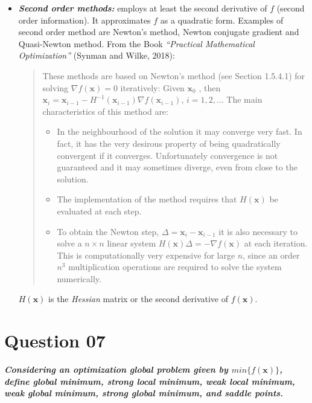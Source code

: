 \documentclass[conference]{IEEEtran}
\begin{document}
\begin{itemize}
	\item \textbf{\textit{Second order methods:}} employs at least the second derivative of $f$ (second order information). It approximates $f$ as a quadratic form. Examples of second order method are Newton’s method, Newton conjugate gradient and Quasi-Newton method.
		\subitem From the Book \textit{``Practical Mathematical Optimization''} (Synman and Wilke, 2018):
		
		\begin{quotation}
			These methods are based on Newton’s method (see Section 1.5.4.1) for solving $\nabla f (\mathbf{x}) = 0$ iteratively: Given $\mathbf{x}_0$ , then $\mathbf{x}_i = \mathbf{x}_{i-1} - H^{-1} (\mathbf{x}_{i-1})\nabla f (\mathbf{x}_{i-1} )$, $i = 1, 2, \hdots $
			The main characteristics of this method are:
			
			\begin{itemize}
				\item In the neighbourhood of the solution it may converge very fast. In fact, it has the very desirous property of being quadratically	convergent if it converges. Unfortunately convergence is not guaranteed and it may sometimes diverge, even from close to the solution.
				\item The implementation of the method requires that $H(\mathbf{x})$  be evaluated at each step.
				\item To obtain the Newton step, $\Delta = \mathbf{x}_i - \mathbf{x}_{i-1}$ it is also necessary to solve a $n \times n$ linear system $H(\mathbf{x})\Delta = -\nabla f (\mathbf{x})$ at each iteration. This is computationally very expensive for large $n$, since an order $n^3$ multiplication operations are required to solve the system numerically.
			\end{itemize}

		\end{quotation}
		$H(\mathbf{x})$ is the \textit{Hessian} matrix or the second derivative of $f(\mathbf{x})$.
\end{itemize}

\section{Question 07}
\textbf{\textit{Considering an optimization global problem given by $min\{f(\mathbf{x})\}$, define global minimum, strong local minimum, weak local minimum, weak global minimum, strong global minimum, and	saddle points.}}
\end{document}
